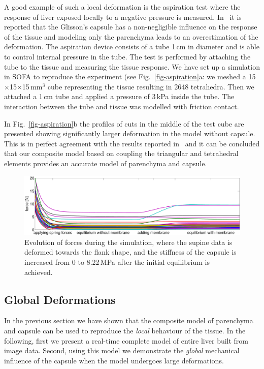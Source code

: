 \documentclass{llncs}
\begin{document}
A good example of such a local deformation is the aspiration test
where the response of liver exposed locally to a negative pressure is measured.
In~\cite{Hollenstein2006} it is reported that the Glisson's
capsule has a non-negligible influence on the response of the tissue and modeling
only the parenchyma leads to an overestimation of the deformation. 
The aspiration device consists of a tube 1\,cm in diameter and is able
to control internal pressure in the tube. The test is performed by
attaching the tube to the tissue and measuring the tissue response. We
have set up a simulation in SOFA to reproduce the experiment (see Fig.~\ref{fig-aspiration}a: we meshed a 15$\times$15$\times$15\,mm$^3$ 
cube representing the tissue 
resulting in 2648 tetrahedra. Then we attached a 1\,cm tube 
and applied a pressure of 3\,kPa inside the tube. The interaction between the tube and 
tissue was modelled with friction contact. 

In Fig.~\ref{fig-aspiration}b the profiles of cuts in the middle of the
test cube are presented showing significantly larger deformation in the model without capsule. This is in perfect 
agreement with the results reported in~\cite{Hollenstein2006} and it can be concluded that 
our composite model based on coupling the triangular and tetrahedral elements provides an accurate 
model of parenchyma and capsule.


\begin{figure}[t]
  \centering
    \includegraphics[width=.95\textwidth]{forceEvolution.pdf}
  \caption{\label{f:forceEvol}Evolution of forces during the simulation, where the supine data is deformed
towards the flank shape, and the stiffness of the capsule is increased from 0 to 8.22\,MPa after the initial equilibrium is achieved.}
\end{figure}

\subsection{Global Deformations}
In the previous section we have shown that the composite model of parenchyma and 
capsule can be used to reproduce the \emph{local} behaviour of the tissue. In the following, 
first we present a real-time complete model of entire liver built from image data. 
Second, using this model we demonstrate the \emph{global} mechanical influence of the capsule when 
the model undergoes large deformations. 
\end{document}
